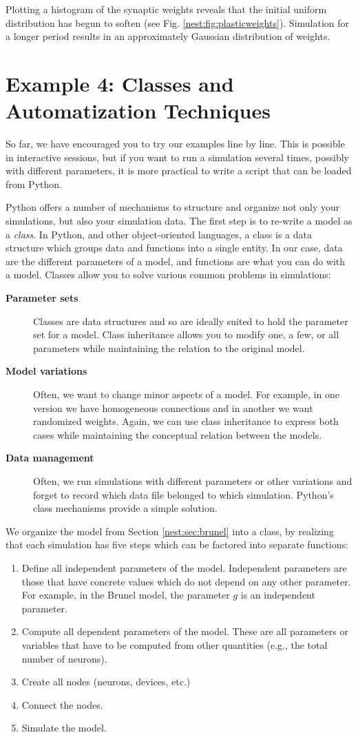\documentclass{article}
\begin{document}
Plotting a histogram of the synaptic weights reveals that the initial
uniform distribution has begun to soften
(see Fig. \ref{nest:fig:plasticweights}). Simulation for a longer period
results in an approximately Gaussian distribution of weights.

\section{Example 4: Classes and Automatization Techniques} 
So far, we have encouraged you to try our examples line by line. This
is possible in interactive sessions, but if you want to run a
simulation several times, possibly with different parameters, it is
more practical to write a script that can be loaded from Python.

Python offers a number of mechanisms to structure and organize not
only your simulations, but also your simulation data.  The first step
is to re-write a model as a \emph{class}. In Python, and other
object-oriented languages, a class is a data structure which groups
data and functions into a single entity. In our case, data are the
different parameters of a model, and functions are what you can do with
a model.
Classes allow you to solve various common problems in simulations:
\begin{description}
\item[\bf Parameter sets] Classes are data structures and so are
  ideally suited to hold the parameter set for a model. Class inheritance
  allows you to modify one, a few, or all parameters while maintaining
  the relation to the original model.
\item[\bf Model variations] Often, we want to change minor aspects of
  a model. For example, in one version we have homogeneous connections
  and in another we want randomized weights. Again, we can use class
  inheritance to express both cases while maintaining the conceptual
  relation between the models.
\item[\bf Data management] Often, we run simulations with different
  parameters or other variations and forget to record which data file
  belonged to which simulation. Python's class mechanisms provide a
  simple solution.
\end{description}
We organize the model from Section \ref{nest:sec:brunel} into a class,
by realizing that each simulation has five steps which can be factored
into separate functions:
\begin{enumerate}
\item Define all independent parameters of the model. Independent
  parameters are those that have concrete values which do not depend
  on any other parameter. For example, in the Brunel model, the
  parameter $g$ is an independent parameter.
\item Compute all dependent parameters of the model. These are all
  parameters or variables that have to be computed from other
  quantities (e.g., the total number of neurons).
\item Create all nodes (neurons, devices, etc.)
\item Connect the nodes.
\item Simulate the model.
\end{enumerate}
\end{document}
